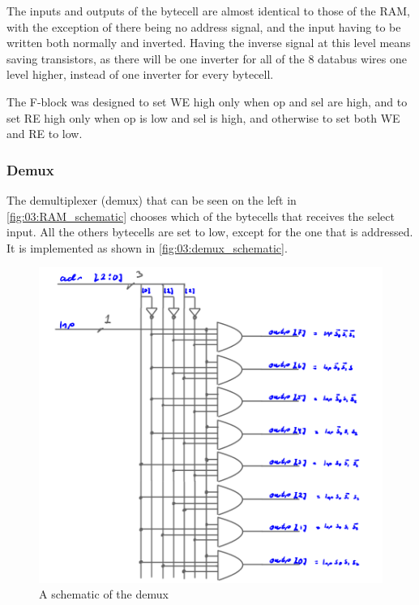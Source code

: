 The inputs and outputs of the bytecell are almost identical to those of the RAM, with the exception of there being no address signal, and the input having to be written both normally and inverted. Having the inverse signal at this level means saving transistors, as there will be one inverter for all of the 8 databus wires one level higher, instead of one inverter for every bytecell.

The F-block was designed to set WE high only when op and sel are high, and to set RE high only when op is low and sel is high, and otherwise to set both WE and RE to low.

\subsubsection{Demux}
The demultiplexer (demux) that can be seen on the left in \autoref{fig:03:RAM_schematic} chooses which of the bytecells that receives the select input. All the others bytecells are set to low, except for the one that is addressed. It is implemented as shown in \autoref{fig:03:demux_schematic}.

\begin{figure}[H]
    \centering
    \includegraphics[width=0.75\linewidth]{LaTeX_2/Figures/demux1to8_schematic.png}
    \caption{A schematic of the demux}
    \label{fig:03:demux_schematic}
\end{figure}

